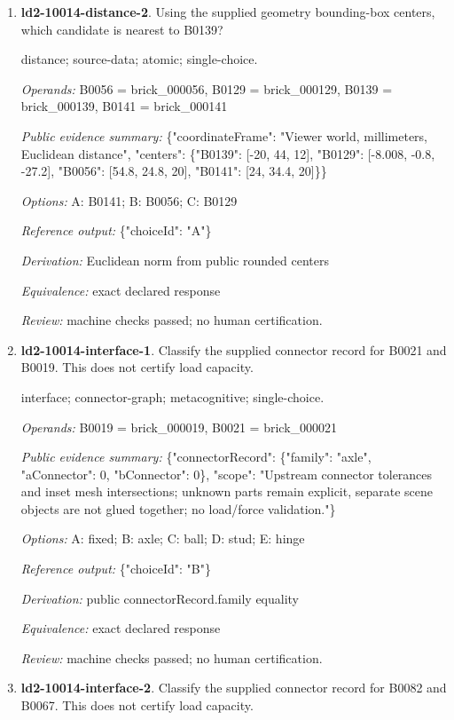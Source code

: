 \begin{enumerate}
\item \textbf{ld2-10014-distance-2}. Using the supplied geometry bounding-box centers, which candidate is nearest to B0139?
\par{\small distance; source-data; atomic; single-choice.\par\textit{Operands:} B0056 = brick\_000056, B0129 = brick\_000129, B0139 = brick\_000139, B0141 = brick\_000141\par\textit{Public evidence summary:} \{"coordinateFrame": "Viewer world, millimeters, Euclidean distance", "centers": \{"B0139": [-20, 44, 12], "B0129": [-8.008, -0.8, -27.2], "B0056": [54.8, 24.8, 20], "B0141": [24, 34.4, 20]\}\}\par\textit{Options:} A: B0141; B: B0056; C: B0129\par\textit{Reference output:} \{"choiceId": "A"\}\par\textit{Derivation:} Euclidean norm from public rounded centers\par\textit{Equivalence:} exact declared response\par\textit{Review:} machine checks passed; no human certification.}
\item \textbf{ld2-10014-interface-1}. Classify the supplied connector record for B0021 and B0019. This does not certify load capacity.
\par{\small interface; connector-graph; metacognitive; single-choice.\par\textit{Operands:} B0019 = brick\_000019, B0021 = brick\_000021\par\textit{Public evidence summary:} \{"connectorRecord": \{"family": "axle", "aConnector": 0, "bConnector": 0\}, "scope": "Upstream connector tolerances and inset mesh intersections; unknown parts remain explicit, separate scene objects are not glued together; no load/force validation."\}\par\textit{Options:} A: fixed; B: axle; C: ball; D: stud; E: hinge\par\textit{Reference output:} \{"choiceId": "B"\}\par\textit{Derivation:} public connectorRecord.family equality\par\textit{Equivalence:} exact declared response\par\textit{Review:} machine checks passed; no human certification.}
\item \textbf{ld2-10014-interface-2}. Classify the supplied connector record for B0082 and B0067. This does not certify load capacity.

\end{enumerate}
